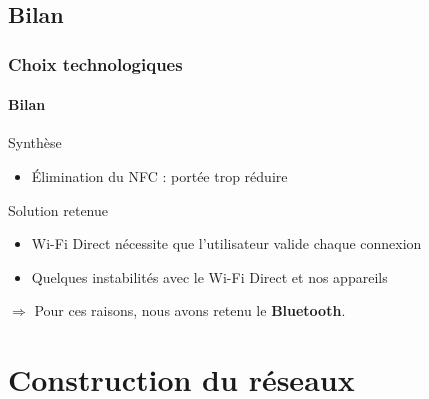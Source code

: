 \documentclass{beamer}
\begin{document}
    \subsection{Bilan}
    \begin{frame}
      \frametitle{Choix technologiques}
      \framesubtitle{Bilan}
      \begin{small}
        \begin{block}{Synthèse}
          \begin{itemize}
            \item {\small Élimination du NFC : portée trop réduire}
          \end{itemize}
          \begin{table}
            \begin{center}
            \end{center}
          \end{table}
        \end{block}
        \begin{block}{Solution retenue}
          \begin{itemize}
            \item Wi-Fi Direct nécessite que l'utilisateur valide chaque connexion
            \item Quelques instabilités avec le Wi-Fi Direct et nos appareils
          \end{itemize}
          \begin{center}
            $ \Rightarrow $ Pour ces raisons, nous avons retenu le \textbf{Bluetooth}.
          \end{center}
        \end{block}
      \end{small}
    \end{frame}
  
  \section{Construction du réseaux}
  \begin{frame}
    \setcounter{tocdepth}{2}
    \tableofcontents[currentsection]
  \end{frame}
\end{document}
